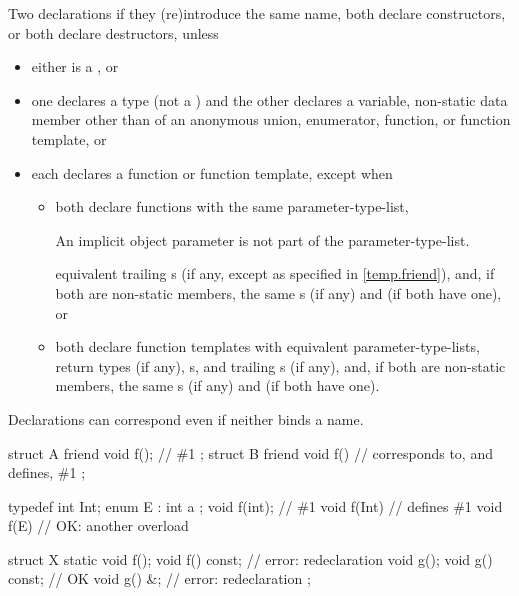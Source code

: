 \pnum
Two declarations 
if they (re)introduce the same name,
both declare constructors, or
both declare destructors,
unless
\begin{itemize}
\item
either is a , or
\item
one declares a type (not a ) and the other declares a
variable,
non-static data member other than of an anonymous union,
enumerator,
function, or
function template, or
\item
each declares a function or function template, except when
\begin{itemize}
\item
both declare functions with the same parameter-type-list,
\begin{footnote}
An implicit object parameter
is not part of the parameter-type-list.
\end{footnote}
equivalent trailing s
(if any, except as specified in \ref{temp.friend}), and,
if both are non-static members,
the same s (if any) and
 (if both have one), or
\item
both declare function templates with equivalent
parameter-type-lists,
return types (if any),
s, and
trailing s (if any), and,
if both are non-static members,
the same s (if any) and
 (if both have one).
\end{itemize}
\end{itemize}
\begin{note}
Declarations can correspond even if neither binds a name.
\begin{example}
\begin{codeblock}
struct A {
friend void f();        // \#1
};
struct B {
  friend void f() {}    // corresponds to, and defines, \#1
};
\end{codeblock}
\end{example}
\end{note}
\begin{example}
\begin{codeblock}
typedef int Int;
enum E : int { a };
void f(int);            // \#1
void f(Int) {}          // defines \#1
void f(E) {}            // OK: another overload

struct X {
  static void f();
  void f() const;       // error: redeclaration
  void g();
  void g() const;       // OK
  void g() &;           // error: redeclaration
};
\end{codeblock}
\end{example}

